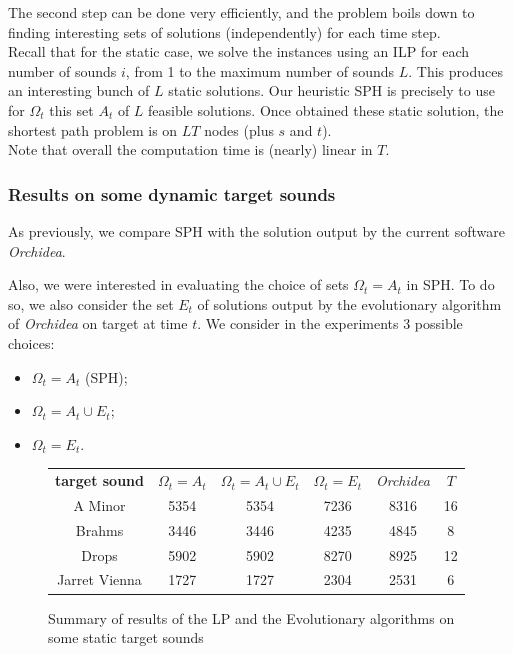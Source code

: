 \documentclass[a4paper]{book}
\begin{document}
The second step can be done very efficiently, and the problem boils down to finding interesting sets of solutions (independently) for each time step. \\
Recall that for the static case, we solve the instances using an ILP for each number of sounds $i$, from 1 to the maximum number of sounds $L$. This produces an interesting bunch of $L$ static solutions. Our heuristic SPH is precisely to use for $\Omega_t$ this set $A_t$ of $L$ feasible solutions. Once obtained these static solution, the shortest path problem is on $LT$ nodes (plus $s$ and $t$). \\
Note that overall the computation time is (nearly) linear in $T$.  


\subsubsection{Results on some dynamic target sounds}
As previously, we compare SPH with the solution output by the current software \textit{Orchidea}. 


Also, we were interested in evaluating the choice of sets $\Omega_t=A_t$ in SPH. To do so, we also consider the set $E_t$ of solutions output by the evolutionary algorithm of \textit{Orchidea} on target at time $t$. We consider in the experiments 3 possible choices:
\begin{itemize}
    \item $\Omega_t=A_t$ (SPH);
    \item $\Omega_t=A_t\cup E_t$;
    \item $\Omega_t=E_t$.
\end{itemize}


\begin{figure}[ht!]
\centering
\begin{tabular}{c||c|c|c|c|c}%
     \textbf{target sound}&$\Omega_t=A_t$&$\Omega_t=A_t\cup E_t$&$\Omega_t=E_t$  &\textit{Orchidea}&$T$\\
A Minor&5354&5354&7236&8316&16\\
Brahms&3446&3446&4235&4845&8\\
Drops&5902&5902&8270&8925&12\\
Jarret Vienna&1727&1727&2304&2531&6\\

 
\end{tabular}
\caption{Summary of results of the LP and the Evolutionary algorithms on some static target sounds }
\label{tab:resultstat3}
\end{figure}
\end{document}

